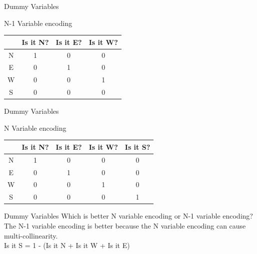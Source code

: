 \documentclass{beamer}
\begin{document}
    \begin{frame}{Dummy Variables}
    \begin{center}
    
    N-1 Variable encoding\\
    \vspace{1em}
    \begin{tabular}{|c|c|c|c|}
        \hline
        & Is it N? &Is it E? &Is it W?\\
        \hline
        \hline
        N & 1&0&0 \\
        E & 0&1&0\\
        W & 0&0&1\\
        S & 0&0&0\\
        \hline
    \end{tabular}
    
    \end{center}
    \end{frame}
    
    
    \begin{frame}{Dummy Variables}
    \begin{center}
    
    N Variable encoding\\
    \vspace{1em}
    \begin{tabular}{|c|c|c|c|c|}
    \hline
    & Is it N? &Is it E? &Is it W? & Is it S?\\
    \hline
    \hline
    N & 1&0&0&0 \\
    E & 0&1&0&0\\
    W & 0&0&1&0\\
    S & 0&0&0&1\\
    \hline
    \end{tabular}
    \end{center}
    \end{frame}
    
    
    
    \begin{frame}{Dummy Variables}
    Which is better N variable encoding or N-1 variable encoding? \\
    
    \pause The N-1 variable encoding is better because the N variable encoding can cause multi-collinearity. \\
    
    \pause Is it S = 1 - (Is it N + Is it W + Is it E) 
    
    \end{frame}
    
\end{document}
